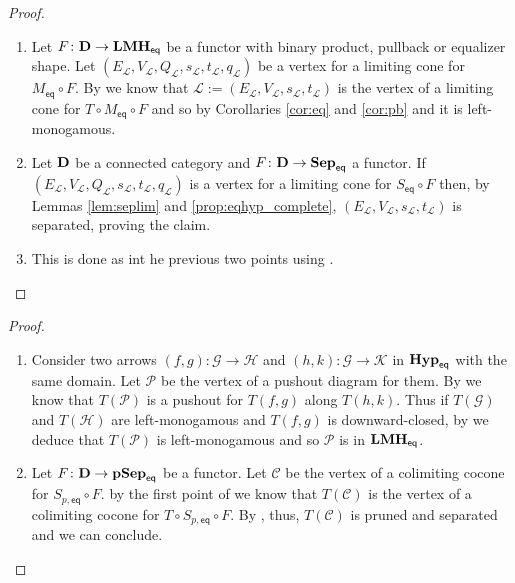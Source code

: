 \documentclass[3p]{elsarticle}
\newcommand{\eq}{\mathsf{eq}}
\def\D{\textbf {\textup{D}}}
\newcommand{\catname}[1]{\textbf{\textup{#1}}}
\newcommand{\EqHyp}{\catname{Hyp}_{\mathsf{eq}}} %
\newcommand{\EqsHyp}{\catname{Sep}_{\mathsf{eq}}}
\newcommand{\EqpsHyp}{\catname{pSep}_{\mathsf{eq}}}
\newcommand{\Eqlmo}{\catname{LMH}_{\mathsf{eq}}}
\theoremstyle{remark}
\theoremstyle{definition}
\begin{document}
\equ*
\begin{proof}\label{proof:equ}
	\begin{enumerate}
		\item Let $F\colon \D\to \Eqlmo$ be a functor with binary product, pullback or equalizer shape. Let $(E_{\mathcal{L}}, V_{\mathcal{L}}, Q_{\mathcal{L}}, s_{\mathcal{L}}, t_{\mathcal{L}}, q_{\mathcal{L}})$ be a vertex for a limiting cone for $M_{\eq}\circ F$. By  we know that $\mathcal{L}:=(E_{\mathcal{L}}, V_{\mathcal{L}}, s_{\mathcal{L}}, t_{\mathcal{L}})$ is the vertex of a limiting cone for $T\circ M_{\eq}\circ F$ and so by Corollaries \ref{cor:eq} and \ref{cor:pb} and  it is left-monogamous.
		
		\item Let $\D$ be a connected category and $F\colon \D\to \EqsHyp$ a functor. If $(E_{\mathcal{L}}, V_{\mathcal{L}}, Q_{\mathcal{L}}, s_{\mathcal{L}}, t_{\mathcal{L}}, q_{\mathcal{L}})$ is a vertex for a limiting cone for $S_{\eq}\circ F$ then, by Lemmas \ref{lem:seplim} and \ref{prop:eqhyp_complete}, $(E_{\mathcal{L}}, V_{\mathcal{L}}, s_{\mathcal{L}}, t_{\mathcal{L}})$  is separated, proving the claim.
		
		\item  This is done as int he previous two points using . \qedhere 
	\end{enumerate}
\end{proof}

\coequ*
\begin{proof}\label{proof:coequ}
	\begin{enumerate} 
		\item Consider two arrows $(f,g)\colon \mathcal{G}\to \mathcal{H}$
		and $(h,k)\colon \mathcal{G}\to \mathcal{K}$ in $\EqHyp$ with the same domain. Let $\mathcal{P}$ be the vertex of a pushout diagram for them. By  we know that $T(\mathcal{P})$ is a pushout for $T(f,g)$ along $T(h,k)$. Thus if $T(\mathcal{G})$ and $T(\mathcal{H})$ are left-monogamous and $T(f,g)$ is downward-closed, by  we deduce that $T(\mathcal{P})$ is left-monogamous and so $\mathcal{P}$ is in $\Eqlmo$.
		
		\item Let $F\colon \D\to \EqpsHyp$ be a functor. Let $\mathcal{C}$ be the vertex of a colimiting cocone for $S_{p, \eq}\circ F$. by the first point of  we know that $T(\mathcal{C})$ is the vertex of a colimiting cocone for $T\circ S_{p,\eq}\circ F$. By , thus, $T(\mathcal{C})$  is pruned and separated and we can conclude. \qedhere
	\end{enumerate}
\end{proof}
\end{document}
